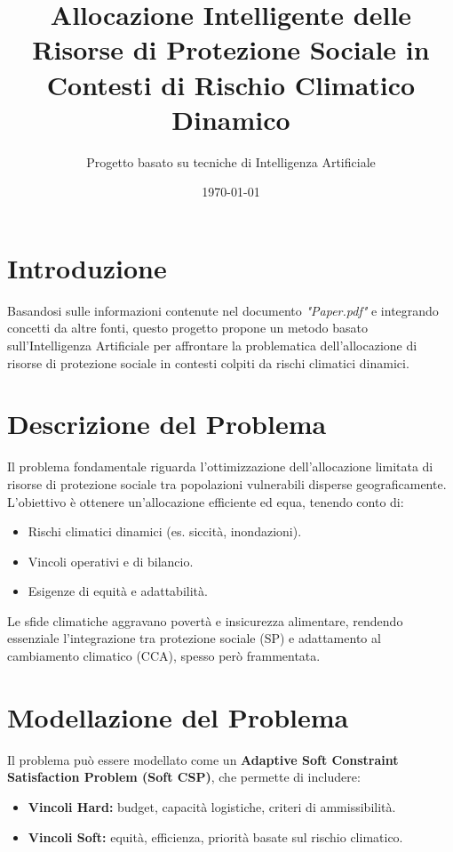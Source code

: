 \documentclass[a4paper,12pt]{article}
\title{\textbf{Allocazione Intelligente delle Risorse di Protezione Sociale in Contesti di Rischio Climatico Dinamico}}
\author{Progetto basato su tecniche di Intelligenza Artificiale}
\date{\today}
\begin{document}
\maketitle

\section*{Introduzione}
Basandosi sulle informazioni contenute nel documento \textit{"Paper.pdf"} e integrando concetti da altre fonti, questo progetto propone un metodo basato sull'Intelligenza Artificiale per affrontare la problematica dell'allocazione di risorse di protezione sociale in contesti colpiti da rischi climatici dinamici.

\section*{Descrizione del Problema}
Il problema fondamentale riguarda l'ottimizzazione dell'allocazione limitata di risorse di protezione sociale tra popolazioni vulnerabili disperse geograficamente. L'obiettivo è ottenere un'allocazione efficiente ed equa, tenendo conto di:

\begin{itemize}
    \item Rischi climatici dinamici (es. siccità, inondazioni).
    \item Vincoli operativi e di bilancio.
    \item Esigenze di equità e adattabilità.
\end{itemize}

Le sfide climatiche aggravano povertà e insicurezza alimentare, rendendo essenziale l'integrazione tra protezione sociale (SP) e adattamento al cambiamento climatico (CCA), spesso però frammentata.

\section*{Modellazione del Problema}
Il problema può essere modellato come un \textbf{Adaptive Soft Constraint Satisfaction Problem (Soft CSP)}, che permette di includere:

\begin{itemize}
    \item \textbf{Vincoli Hard:} budget, capacità logistiche, criteri di ammissibilità.
    \item \textbf{Vincoli Soft:} equità, efficienza, priorità basate sul rischio climatico.
\end{itemize}
\end{document}
